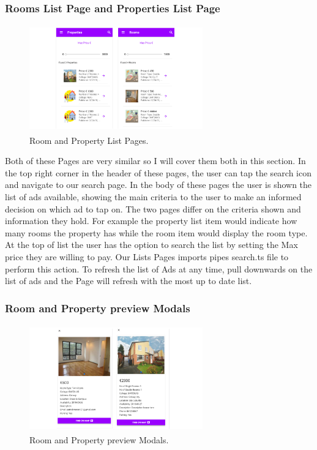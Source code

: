 \subsubsection{Rooms List Page and Properties List Page}

\begin{figure}[h]
\centering
\includegraphics[width=7.5cm, height=4.6cm]{img/adLists}
\caption{Room and Property List Pages.}
\end{figure}


Both of these Pages are very similar so I will cover them both in this section. In the top right corner in the header of these pages, the user can tap the search icon and navigate to our search page. In the body of these pages the user is shown the list of ads available, showing the main criteria to the user to make an informed decision on which ad to tap on. The two pages differ on the criteria shown and information they hold. For example the property list item would indicate how many rooms the property has while the room item would display the room type. At the top of list the user has the option to search the list by setting the Max price they are willing to pay. Our Lists Pages imports pipes search.ts file to perform this action. To refresh the list of Ads at any time, pull downwards on the list of ads and the Page will refresh with the most up to date list.

\subsubsection{Room and Property preview Modals}

\begin{figure}[h]
\centering
\includegraphics[width=7.5cm, height=4.6cm]{img/Modals}
\caption{Room and Property preview Modals.}
\end{figure}  

